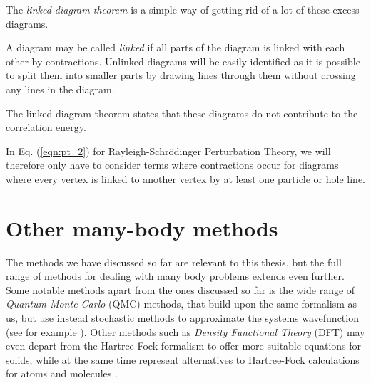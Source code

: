 The \emph{linked diagram theorem} is a simple way of getting rid of a lot of these excess diagrams.

A diagram may be called \emph{linked} if all parts of the diagram is
linked with each other by contractions. Unlinked diagrams will be
easily identified as it is possible to split them into smaller parts
by drawing lines through them without crossing any lines in the
diagram.

The linked diagram theorem states that these diagrams do not contribute to the correlation energy. 

In Eq. (\ref{eqn:pt_2}) for Rayleigh-Schrödinger Perturbation Theory, we will therefore only have to consider terms where contractions occur for diagrams where every vertex is linked to another vertex by at least one particle or hole line.

\section{Other many-body methods}

The methods we have discussed so far are relevant to this thesis, but the full range of methods for dealing with many body problems extends even further. Some notable methods apart from the ones discussed so far is the wide range of \emph{Quantum Monte Carlo} (QMC) methods, that build upon the same formalism as us, but use instead stochastic methods to approximate the systems wavefunction (see for example \cite[Chapter 12]{Thijssen}). Other methods such as \emph{Density Functional Theory} (DFT) may even depart from the Hartree-Fock formalism to offer more suitable equations for solids, while at the same time represent alternatives to Hartree-Fock calculations for atoms and molecules \cite[Chapter 5]{Thijssen}.